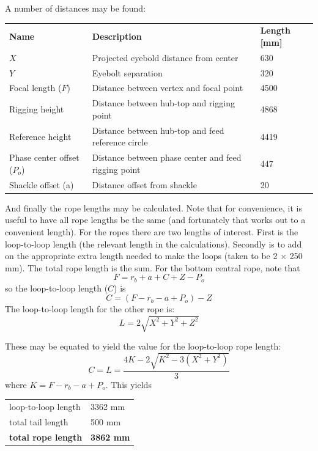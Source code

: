 \documentclass{article}
\begin{document}
\noindent
A number of distances may be found:
\vspace{0.1in}

\begin{tabular}{l l l}
\bf{Name} & \bf{Description} & \bf{Length [mm]} \\
$X$ & Projected eyebold distance from center & 630 \\
$Y$ & Eyebolt separation & 320 \\
Focal length ($F$) & Distance between vertex and focal point & 4500 \\
Rigging height & Distance between hub-top and rigging point & 4868\\
Reference height & Distance between hub-top and feed reference circle & 4419 \\
Phase center offset ($P_o$) & Distance between phase center and feed rigging point & 447 \\
Shackle offset (a) & Distance offset from shackle & 20\\
\end{tabular}
\vspace{0.1in}

And finally the rope lengths may be calculated.  Note that for convenience, it is useful to have all rope lengths be the same (and fortunately that works out to a convenient length).  For the ropes there are two lengths of interest.  First is the loop-to-loop length (the relevant length in the calculations).  Secondly is to add on the appropriate extra length needed to make the loops (taken to be 2 $\times$ 250 mm).  The total rope length is the sum.  For the bottom central rope, note that
\begin{equation}
F = r_b + a + C + Z - P_{o}
\end{equation}
so the loop-to-loop length ($C$) is
\begin{equation}
C = (F - r_b - a + P_o) - Z
\end{equation}
The loop-to-loop length for the other rope is:
\begin{equation}
L = 2\sqrt{X^2 + Y^2 + Z^2}
\end{equation}

These may be equated to yield the value for the loop-to-loop rope length:
\begin{equation}
 C = L = \frac{4K - 2\sqrt{K^2 - 3(X^2 + Y^2)}}{3}
\end{equation}
where $K = F - r_b - a +P_o$.  This yields
\vspace{.1in}

\begin{tabular}{l l}
loop-to-loop length & 3362 mm\\
total tail length & 500 mm \\
{\bf total rope length} & {\bf 3862 mm} \\
\end{tabular}
\end{document}
